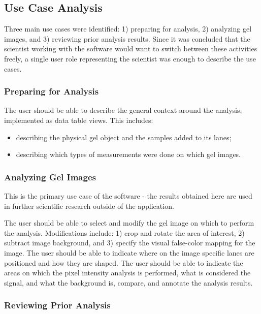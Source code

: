 \subsection{Use Case Analysis}

Three main use cases were identified: 1) preparing for analysis, 2) analyzing gel images, and 3) reviewing prior analysis results. Since it was concluded that the scientist working with the software would want to switch between these activities freely, a single user role representing the scientist was enough to describe the use cases.

\subsubsection{Preparing for Analysis}

The user should be able to describe the general context around the analysis, implemented as data table views. This includes:
\begin{itemize}
    \item describing the physical gel object and the samples added to its lanes;
    \item describing which types of measurements were done on which gel images.
\end{itemize}

\subsubsection{Analyzing Gel Images}

This is the primary use case of the software - the results obtained here are used in further scientific research outside of the application. 

The user should be able to select and modify the gel image on which to perform the analysis. Modifications include: 1) crop and rotate the area of interest, 2) subtract image background, and 3) specify the visual false-color mapping for the image. The user should be able to indicate where on the image specific lanes are positioned and how they are shaped. The user should be able to indicate the areas on which the pixel intensity analysis is performed, what is considered the signal, and what the background is, compare, and annotate the analysis results.

\subsubsection{Reviewing Prior Analysis}

